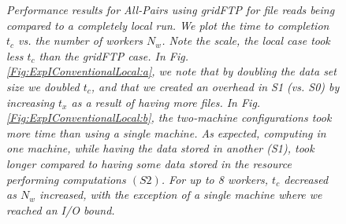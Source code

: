 \documentclass{rspublic}
\begin{document}
\begin{figure}[!ht]
\begin{center}
\caption{\textit{Performance results for All-Pairs using gridFTP for
file reads being compared to a completely local run. We plot the time to
completion $t_c$ vs. the number of workers $N_w$. Note the scale, the
local case took less $t_c$ than the gridFTP case. In Fig.
\ref{Fig:ExpIConventionalLocal:a}, we note that by doubling the data set
size we doubled $t_c$, and that we created an overhead in S1 (vs. S0) by
increasing $t_x$ as a result of having more files. In Fig.
\ref{Fig:ExpIConventionalLocal:b}, the two-machine configurations took
more time than using a single machine. As expected, computing in one
machine, while having the data stored in another (S1), took longer
compared to having some data stored in the resource performing
computations $(S2)$. For up to 8 workers, $t_c$ decreased as $N_w$
increased, with the exception of a single machine where we reached an
I/O bound.}}
\label{Fig:ExpIConventionalLocal}
\end{center}
\end{figure}
\end{document}
